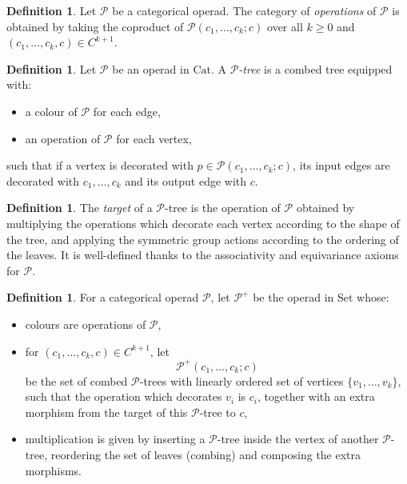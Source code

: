 \documentclass[]{amsart}
\theoremstyle{definition}
\newtheorem{definition}[theorem]{Definition}
\begin{document}
\begin{definition}\label{definitioncategoryofoperations}
	Let $\mathcal{P}$ be a categorical operad. The category of \emph{operations} of $\mathcal{P}$ is obtained by taking the coproduct of $\mathcal{P}(c_1,\ldots,c_k;c)$ over all $k \geq 0$ and $(c_1,\ldots,c_k,c) \in C^{k+1}$.
\end{definition}

\begin{definition}\cite[Section 3.3]{baezdolan}
	Let $\mathcal{P}$ be an operad in $\mathrm{Cat}$. A \emph{$\mathcal{P}$-tree} is a combed tree equipped with:
	\begin{itemize}
		\item a colour of $\mathcal{P}$ for each edge,
		\item an operation of $\mathcal{P}$ for each vertex,
	\end{itemize}
	such that if a vertex is decorated with $p \in \mathcal{P}(c_1,\ldots,c_k;c)$, its input edges are decorated with $c_1,\ldots,c_k$ and its output edge with $c$.
\end{definition}


\begin{definition}\label{definitiontarget}
	The \emph{target} of a $\mathcal{P}$-tree is the operation of $\mathcal{P}$ obtained by multiplying the operations which decorate each vertex according to the shape of the tree, and applying the symmetric group actions according to the ordering of the leaves. It is well-defined thanks to the associativity and equivariance axioms for $\mathcal{P}$.
\end{definition}



\begin{definition}\label{definitionpplus}
	For a categorical operad $\mathcal{P}$, let $\mathcal{P}^+$ be the operad in $\mathrm{Set}$ whose:
	\begin{itemize}
		\item colours are operations of $\mathcal{P}$,
		\item for $(c_1,\ldots,c_k,c) \in C^{k+1}$, let
		\[
		\mathcal{P}^+(c_1,\ldots,c_k;c)
		\]
		be the set of combed $\mathcal{P}$-trees with linearly ordered set of vertices $\{v_1,\ldots,v_k\}$, such that the operation which decorates $v_i$ is $c_i$, together with an extra morphism from the target of this $\mathcal{P}$-tree to $c$,
		\item multiplication is given by inserting a $\mathcal{P}$-tree inside the vertex of another $\mathcal{P}$-tree, reordering the set of leaves (combing) and composing the extra morphisms.
	\end{itemize}
\end{definition}
\end{document}
